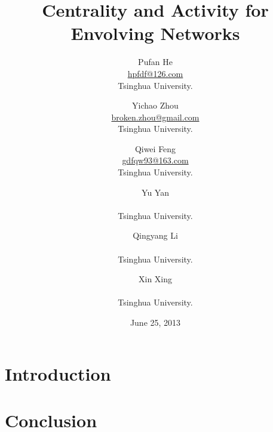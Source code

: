 \documentclass[a4paper,twocolumn,10pt]{article}
\title
{
	Centrality and Activity for Envolving Networks
}
\author
{
	Pufan He\\
	\href{mailto:hpfdf@126.com}{hpfdf@126.com}\\
	Tsinghua University.
	\and
	Yichao Zhou\\
	\href{mailto:broken.zhou@gmail.com}{broken.zhou@gmail.com}\\
	Tsinghua University.
	\and
	Qiwei Feng\\
	\href{mailto:gdfqw93@163.com}{gdfqw93@163.com}\\
	Tsinghua University.
	\and
	Yu Yan\\
	\href{mailto:}{}\\
	Tsinghua University.
	\and
	Qingyang Li\\
	\href{mailto:}{}\\
	Tsinghua University.
	\and
	Xin Xing\\
	\href{mailto:}{}\\
	Tsinghua University.
}
\date
{
	June 25, 2013
}
\begin{document}
\maketitle
\begin{abstract}

\end{abstract}

\section{Introduction}
\section{}
\section{}
\section{Conclusion}
\end{document}

